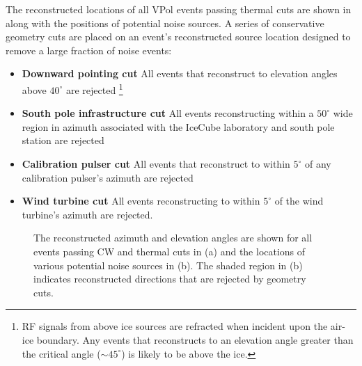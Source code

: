 The reconstructed locations of all VPol events passing thermal cuts are shown in  along with the positions of potential noise sources. A series of conservative geometry cuts are placed on an event's reconstructed source location designed to remove a large fraction of noise events:

\begin{itemize}

\item \textbf{Downward pointing cut} All events that reconstruct to elevation angles above $40^\circ$ are rejected \footnote{RF signals from above ice sources are refracted when incident upon the air-ice boundary. Any events that reconstructs to an elevation angle greater than the critical angle ($\sim 45^{\circ}$) is likely to be above the ice.}

\item \textbf{South pole infrastructure cut} All events reconstructing within a $50^\circ$ wide region in azimuth associated with the IceCube laboratory and south pole station are rejected

\item \textbf{Calibration pulser cut} All events that reconstruct to within $5^\circ$ of any calibration pulser's azimuth are rejected

\item \textbf{Wind turbine cut} All events reconstructing to within $5^\circ$ of the wind turbine's azimuth are rejected.

\end{itemize}

\begin{figure}[htpb]
  \hfill
  \caption{The reconstructed azimuth and elevation angles are shown for all events passing CW and thermal cuts in (a) and the locations of various potential noise sources in (b). The shaded region in (b) indicates reconstructed directions that are rejected by geometry cuts.}
  \label{fig:Analysis:Anthroprogenic-Cuts:Geometry-Cuts:VPol-Reco}
\end{figure}

